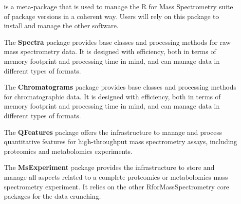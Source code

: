 \documentclass[final]{beamer}
\newcommand{\bpkg}[1]{{\textbf{#1}}}
\begin{document}
\begin{frame}[fragile]
\begin{columns}[T]
\begin{column}{.2\textwidth}
    \end{column}

    \begin{column}{.35\textwidth}

      \begin{block}{}
        \justifying \bpkg{RforMassSpectrometry} is a meta-package that
        is used to manage the R for Mass Spectrometry suite of package
        versions in a coherent way. Users will rely on this package to
        install and manage the other software.
      \end{block}

      \vspace{1cm}

      \begin{block}{}
        \justifying The \bpkg{Spectra} package provides base classes
        and processing methods for raw mass spectrometry data. It is
        designed with efficiency, both in terms of memory footprint
        and processing time in mind, and can manage data in different
        types of formats.
      \end{block}

      \vspace{1cm}

      \begin{block}{}
        \justifying The \bpkg{Chromatograms} package provides base
        classes and processing methods for chromatographic data. It
        is designed with efficiency, both in terms of memory footprint
        and processing time in mind, and can manage data in different
        types of formats.
      \end{block}

      \vspace{1cm}

      \begin{block}{}
        \justifying The \bpkg{QFeatures} package offers the
        infrastructure to manage and process quantitative features for
        high-throughput mass spectrometry assays, including proteomics
        and metabolomics experiments.
      \end{block}

      \vspace{1cm}

      \begin{block}{}
        \justifying The \bpkg{MsExperiment} package provides the
        infrastructure to store and manage all aspects related to a
        complete proteomics or metabolomics mass spectrometry
        experiment. It relies on the other RforMassSpectrometry core
        packages for the data crunching.
      \end{block}


\end{column}
\end{columns}
\end{frame}
\end{document}

